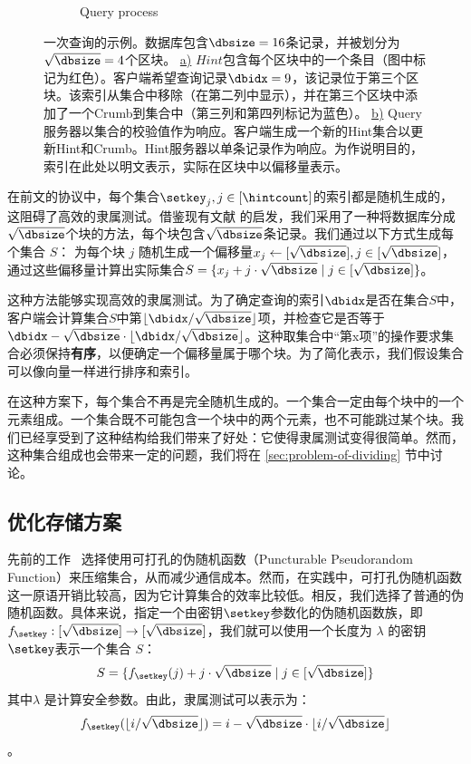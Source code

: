 \begin{figure}
\begin{subfigure}{0.5\textwidth}
        \caption{Query process} \label{fig:query-b}
    \end{subfigure}%
    \caption{一次查询的示例。数据库包含$\dbsize=16$条记录，并被划分为$\sqrt{\dbsize}=4$个区块。 \hyperref[fig:query-a]{a)} $Hint$包含每个区块中的一个条目（图中标记为红色）。客户端希望查询记录$\dbidx=9$，该记录位于第三个区块。该索引从集合中移除（在第二列中显示），并在第三个区块中添加了一个Crumb到集合中（第三列和第四列标记为蓝色）。 \hyperref[fig:query-b]{b)} Query服务器以集合的校验值作为响应。客户端生成一个新的Hint集合以更新Hint和Crumb。Hint服务器以单条记录作为响应。为作说明目的，索引在此处以明文表示，实际在区块中以偏移量表示。}
    \label{fig:query}
\end{figure}

在前文的协议中，每个集合$\setkey_j, j\in[\hintcount]$的索引都是随机生成的，这阻碍了高效的隶属测试。借鉴现有文献 \cite{Piano, C:LazPap23} 的启发，我们采用了一种将数据库分成$\sqrt{\dbsize}$个块的方法，每个块包含$\sqrt{\dbsize}$条记录。我们通过以下方式生成每个集合 $S$：
为每个块 $j$ 随机生成一个偏移量$x_j \leftarrow [\sqrt{\dbsize}], j \in [\sqrt{\dbsize}]$，通过这些偏移量计算出实际集合$S=\{x_j+j\cdot \sqrt{\dbsize} \mid j \in [\sqrt{\dbsize}]\}$。

这种方法能够实现高效的隶属测试。为了确定查询的索引$\dbidx$是否在集合$S$中，客户端会计算集合$S$中第$\lfloor \dbidx/\sqrt{\dbsize}\rfloor$项，并检查它是否等于$\dbidx-\sqrt{\dbsize}\cdot\lfloor \dbidx/\sqrt{\dbsize}\rfloor$。这种取集合中“第x项”的操作要求集合必须保持\textbf{有序}，以便确定一个偏移量属于哪个块。为了简化表示，我们假设集合可以像向量一样进行排序和索引。

在这种方案下，每个集合不再是完全随机生成的。一个集合一定由每个块中的一个元素组成。一个集合既不可能包含一个块中的两个元素，也不可能跳过某个块。我们已经享受到了这种结构给我们带来了好处：它使得隶属测试变得很简单。然而，这种集合组成也会带来一定的问题，我们将在 \ref{sec:problem-of-dividing} 节中讨论。


\subsection{优化存储方案}
先前的工作~\cite{EC:CorKog20, C:LazPap23} 选择使用可打孔的伪随机函数（Puncturable Pseudorandom Function）来压缩集合，从而减少通信成本。然而，在实践中，可打孔伪随机函数这一原语开销比较高，因为它计算集合的效率比较低。相反，我们选择了普通的伪随机函数。具体来说，指定一个由密钥$\setkey$参数化的伪随机函数族，即$f_{\setkey}: [\sqrt{\dbsize}] \to [\sqrt{\dbsize}]$，我们就可以使用一个长度为 $\lambda$ 的密钥$\setkey$表示一个集合 $S$：$$S = \{f_{\setkey}(j) + j \cdot \sqrt{\dbsize} \mid j \in [\sqrt{\dbsize}]\}$$ 其中$\lambda$ 是计算安全参数。由此，隶属测试可以表示为：$$f_{\setkey}(\lfloor i/\sqrt{\dbsize}\rfloor) = i - \sqrt{\dbsize}\cdot\lfloor i/\sqrt{\dbsize}\rfloor$$。


